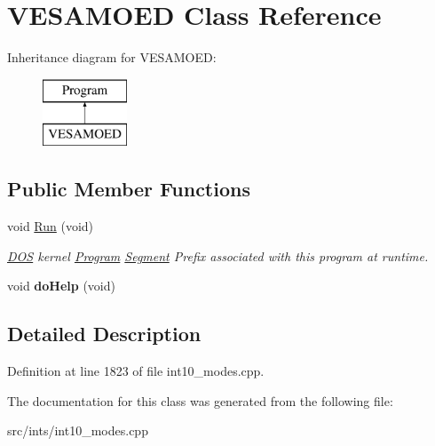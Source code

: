 \hypertarget{classVESAMOED}{\section{V\-E\-S\-A\-M\-O\-E\-D Class Reference}
\label{classVESAMOED}
}
Inheritance diagram for V\-E\-S\-A\-M\-O\-E\-D\-:\begin{figure}[H]
\begin{center}
\leavevmode
\includegraphics[height=2.000000cm]{classVESAMOED}
\end{center}
\end{figure}
\subsection*{Public Member Functions}
\begin{DoxyCompactItemize}
\item 
\hypertarget{classVESAMOED_a28a85c525cde20cbffbfbed307b1747e}{void \hyperlink{classVESAMOED_a28a85c525cde20cbffbfbed307b1747e}{Run} (void)}\label{classVESAMOED_a28a85c525cde20cbffbfbed307b1747e}

\begin{DoxyCompactList}\small\item\em \hyperlink{classDOS}{D\-O\-S} kernel \hyperlink{classProgram}{Program} \hyperlink{structSegment}{Segment} Prefix associated with this program at runtime. \end{DoxyCompactList}\item 
\hypertarget{classVESAMOED_a2c8bf90a08d8a67761958333dcbf298b}{void {\bfseries do\-Help} (void)}\label{classVESAMOED_a2c8bf90a08d8a67761958333dcbf298b}

\end{DoxyCompactItemize}


\subsection{Detailed Description}


Definition at line 1823 of file int10\-\_\-modes.\-cpp.



The documentation for this class was generated from the following file\-:\begin{DoxyCompactItemize}
\item 
src/ints/int10\-\_\-modes.\-cpp\end{DoxyCompactItemize}
